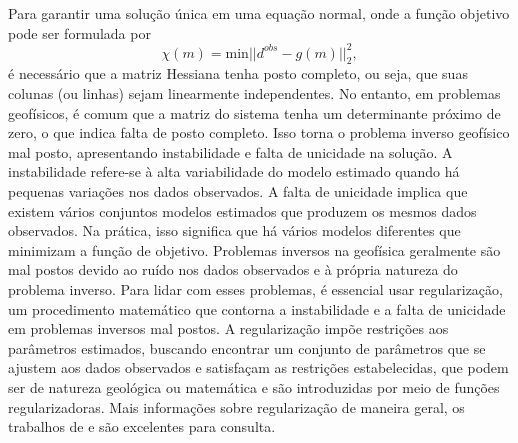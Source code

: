 Para garantir uma solução única em uma equação normal, onde a função objetivo pode ser formulada por
\begin{equation}
	\chi(m) = \text{min}||d^{obs} -g(m)||^2_2,
\end{equation}
\noindent é necessário que a matriz Hessiana tenha posto completo, ou seja, que suas colunas (ou linhas) sejam linearmente independentes. No entanto, em problemas geofísicos, é comum que a matriz do sistema tenha um determinante próximo de zero, o que indica falta de posto completo. Isso torna o problema inverso geofísico mal posto, apresentando instabilidade e falta de unicidade na solução. A instabilidade refere-se à alta variabilidade do modelo estimado quando há pequenas variações nos dados observados. A falta de unicidade implica que existem vários conjuntos modelos estimados que produzem os mesmos dados observados. Na prática, isso significa que há vários modelos diferentes que minimizam a função de objetivo. Problemas inversos na geofísica geralmente são mal postos devido ao ruído nos dados observados e à própria natureza do problema inverso. Para lidar com esses problemas, é essencial usar regularização, um procedimento matemático que contorna a instabilidade e a falta de unicidade em problemas inversos mal postos. A regularização impõe restrições aos parâmetros estimados, buscando encontrar um conjunto de parâmetros que se ajustem aos dados observados e satisfaçam as restrições estabelecidas, que podem ser de natureza geológica ou matemática e são introduzidas por meio de funções regularizadoras. Mais informações sobre regularização de maneira geral, os trabalhos de  e  são excelentes para consulta.   

